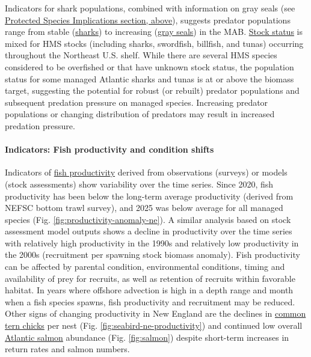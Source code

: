 \documentclass[
  10pt,
]{article}
\begin{document}
Indicators for shark populations, combined with information on gray seals (see \hyperref[protected-species]{Protected Species Implications section, above}), suggests predator populations range from stable (\href{https://noaa-edab.github.io/catalog/hms_cpue.html}{sharks}) to increasing (\href{https://noaa-edab.github.io/catalog/seal_pups.html}{gray seals}) in the MAB. \href{https://noaa-edab.github.io/catalog/hms_stock_status.html}{Stock status} is mixed for HMS stocks (including sharks, swordfish, billfish, and tunas) occurring throughout the Northeast U.S. shelf. While there are several HMS species considered to be overfished or that have unknown stock status, the population status for some managed Atlantic sharks and tunas is at or above the biomass target, suggesting the potential for robust (or rebuilt) predator populations and subsequent predation pressure on managed species. Increasing predator populations or changing distribution of predators may result in increased predation pressure.

\paragraph{Indicators: Fish productivity and condition shifts}\label{indicators-fish-productivity-and-condition-shifts-1}

Indicators of \href{https://noaa-edab.github.io/catalog/productivity_anomaly.html}{fish productivity} derived from observations (surveys) or models (stock assessments) show variability over the time series. Since 2020, fish productivity has been below the long-term average productivity (derived from NEFSC bottom trawl survey), and 2025 was below average for all managed species (Fig. \ref{fig:productivity-anomaly-ne}). A similar analysis based on stock assessment model outputs shows a decline in productivity over the time series with relatively high productivity in the 1990s and relatively low productivity in the 2000s (recruitment per spawning stock biomass anomaly). Fish productivity can be affected by parental condition, environmental conditions, timing and availability of prey for recruits, as well as retention of recruits within favorable habitat. In years where offshore advection is high in a depth range and month when a fish species spawns, fish productivity and recruitment may be reduced. Other signs of changing productivity in New England are the declines in \href{https://noaa-edab.github.io/catalog/seabird_ne.html}{common tern chicks} per nest (Fig. \ref{fig:seabird-ne-productivity}) and continued low overall \href{https://noaa-edab.github.io/catalog/gom_salmon.html}{Atlantic salmon} abundance (Fig. \ref{fig:salmon}) despite short-term increases in return rates and salmon numbers.
\end{document}
